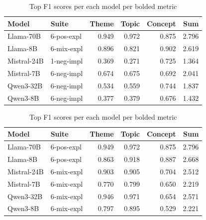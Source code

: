 \begin{table}
    \begin{tabular}{llrrrr}
    \toprule
    Model & Suite & Theme & Topic & \bfseries Concept & Sum \\
    \midrule
    Llama-70B & 6-pos-expl & 0.949 & 0.972 & 0.875 & 2.796 \\
    Llama-8B & 6-mix-expl & 0.896 & 0.821 & 0.902 & 2.619 \\
    Mistral-24B & 1-neg-impl & 0.369 & 0.271 & 0.725 & 1.364 \\
    Mistral-7B & 6-neg-impl & 0.674 & 0.675 & 0.692 & 2.041 \\
    Qwen3-32B & 6-neg-impl & 0.534 & 0.559 & 0.744 & 1.837 \\
    Qwen3-8B & 6-neg-impl & 0.377 & 0.379 & 0.676 & 1.432 \\
    \bottomrule
    \end{tabular}
    \quad
    \begin{tabular}{llrrrr}
    \toprule
    Model & Suite & Theme & Topic & Concept & \bfseries Sum \\
    \midrule
    Llama-70B & 6-pos-expl & 0.949 & 0.972 & 0.875 & 2.796 \\
    Llama-8B & 6-pos-expl & 0.863 & 0.918 & 0.887 & 2.668 \\
    Mistral-24B & 6-mix-expl & 0.903 & 0.905 & 0.704 & 2.512 \\
    Mistral-7B & 6-mix-expl & 0.770 & 0.799 & 0.650 & 2.219 \\
    Qwen3-32B & 6-mix-expl & 0.946 & 0.971 & 0.654 & 2.571 \\
    Qwen3-8B & 6-mix-expl & 0.797 & 0.895 & 0.529 & 2.221 \\
    \bottomrule
    \end{tabular}
            
    \caption{Top F1 scores per each model per bolded metric}
    \label{tab:placeholder}
\end{table}